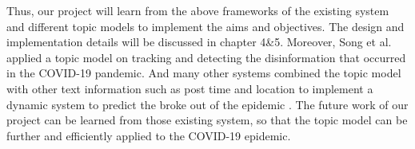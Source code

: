 Thus, our project will learn from the above frameworks of the existing system and different topic models to implement the aims and objectives. The design and implementation details will be discussed in chapter 4\&5. Moreover, Song et al. \cite{song2021classification} applied a topic model on tracking and detecting the disinformation that occurred in the COVID-19 pandemic. And many other systems combined the topic model with other text information such as post time and location to implement a dynamic system to predict the broke out of the epidemic \cite{li2020global}. The future work of our project can be learned from those existing system, so that the topic model can be further and efficiently applied to the COVID-19 epidemic.
